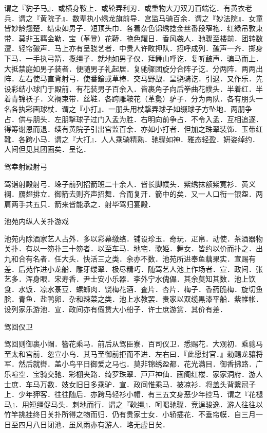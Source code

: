 \documentclass[]{article}
\begin{document}
谓之『豹子马』．或横身鞍上．或轮弄利刃．或重物大刀双刀百端讫．有黄衣老兵．谓之『黄院子』．数辈执小绣龙旗前导．宫监马骑百余．谓之『妙法院』．女童皆妙龄翘楚．结束如男子．短顶头巾．各着杂色锦绣捻金丝番段窄袍．红緑吊敦束带．莫非玉羁金勒．宝（革登）花鞯．艳色耀日．香风袭人．驰骤至楼前．团转数遭．轻帘皷声．马上亦有呈骁艺者．中贵人许畋押队．招呼成列．皷声一齐．掷身下马．一手执弓箭．揽缰子．就地如男子仪．拜舞山呼讫．复听皷声．骗马而上．大抵禁庭如男子装者．便随男子礼起居．复驰骤团旋分合阵子讫．分两阵．两两出阵．左右使马直背射弓．使番鎗或草棒．交马野战．呈骁骑讫．引退．又作乐．先设彩结小球门于殿前．有花装男子百余入．皆裹角子向后拳曲花幞头．半着红．半着青锦袄子．义襕束带．丝鞋．各跨雕鞍花（革毚）驴子．分为两队．各有朋头一名各执彩画球杖．谓之『小打』．一朋头用杖撃弄球子如缀球子方坠地．两朋争占．供与朋头．左朋撃球子过门入孟为胜．右明向前争占．不令入孟．互相追逐．得筹谢恩而退．续有黄院子引出宫监百余．亦如小打者．但加之珠翠装饰．玉带红靴．各跨小马．谓之『大打』．人人乘骑精熟．驰骤如神．雅态轻盈．姸姿绰约．人间但见其团画矣．呈讫．

驾幸射殿射弓

驾诣射殿射弓．垛子前列招箭班二十余人．皆长脚幞头．紫绣抹额紫寛衫．黄义襕．鴈翅排立．御箭去则齐声招舞．合而复开．箭中的矣．又一人口衔一银盌．两肩两手共五只．箭来皆能承之．射毕驾归宴殿．

池苑内纵人关扑游戏

池苑内除酒家艺人占外．多以彩幕缴络．铺设珍玉．奇玩．疋帛．动使．茶酒器物关扑．有以一笏扑三十笏者．以至车马．地宅．歌姫．舞女．皆约以价而扑之．出九和合有名者．任大头．快活三之类．余亦不数．池苑所进奉鱼藕果实．宣赐有差．后苑作进小龙船．雕牙缕翠．极尽精巧．随驾艺人池上作场者．宣．政间．张艺多．浑身眼．宋寿香．尹士安小乐器．李外宁水傀儡．其余莫知其数．池上饮食．水饭．凉水菉豆．螺蛳肉．饶梅花酒．査片．杏片．梅子．香药脆梅．旋切鱼脍．青鱼．盐鸭卵．杂和辣菜之类．池上水教罢．贵家以双缆黒漆平船．紫帷帐．设列家乐游池．宣．政间亦有假赁大小船子．许士庶游赏．其价有差．

驾回仪卫

驾回则御裹小帽．簪花乘马．前后从驾臣寮．百司仪卫．悉赐花．大观初．乘骢马至太和宫前．忽宣小鸟．其马至御前拒而不进．左右曰．『此愿封官．』勑赐龙骧将军．然后就辔．盖小鸟平日御爱之马也．莫非锦绣盈都．花光满目．御香拂路．广乐喧空．宝骑交驰．彩棚夹路．绮罗珠翠．戸戸神仙．画阁红楼．家家洞府．游人士庶．车马万数．妓女旧日多乘驴．宣．政间惟乘马．披凉衫．将盖头背繋冠子上．少年狎客．往往随后．亦跨马轻衫小帽．有三五文身恶少年控马．谓之『花褪马』．用短缰促马头．刺地而行．谓之『鞅缰』．呵喝驰骤．竞逞骏逸．游人往往以竹竿挑挂终日关扑所得之物而归．仍有贵家士女．小轿插花．不垂帘幙．自三月一日至四月八日闭池．虽风雨亦有游人．略无虚日矣．
\end{document}
